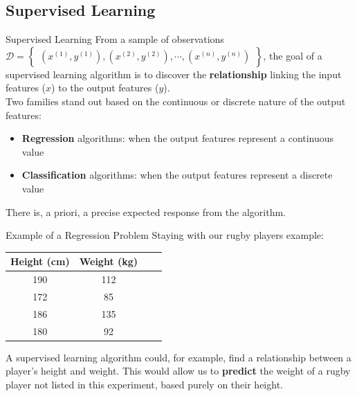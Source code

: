 \subsection[Supervised Learning]{Supervised Learning}

\begin{frame}{Supervised Learning}
	From a sample of observations $\mathcal{D} = \begin{Bmatrix}(x^{(1)}, y^{(1)}), (x^{(2)}, y^{(2)}), \cdots, (x^{(n)}, y^{(n)})\end{Bmatrix}$, the goal of a supervised learning algorithm is to discover the \textbf{relationship} linking the input features ($x$) to the output features ($y$). \\
	\vspace{0.5cm}
	Two families stand out based on the continuous or discrete nature of the output features:
	\begin{itemize}
		\item \textbf{Regression} algorithms: when the output features represent a continuous value
		\item \textbf{Classification} algorithms: when the output features represent a discrete value
	\end{itemize}
	\vspace{0.5cm}
	There is, a priori, a precise expected response from the algorithm.
\end{frame}

\begin{frame}{Example of a Regression Problem}
	Staying with our rugby players example:
	\begin{table}
		\centering
		\begin{tabular}{|c|c|c|c|}
			\hline
			\textbf{Height} (cm) & \textbf{Weight} (kg) \\ \hline
			190              & 112 \\
			172              & 85  \\
			186              & 135 \\
			180              & 92  \\
			\hline
		\end{tabular}
	\end{table}
	A supervised learning algorithm could, for example, find a relationship between a player's height and weight. This would allow us to \textbf{predict} the weight of a rugby player not listed in this experiment, based purely on their height.
\end{frame}

